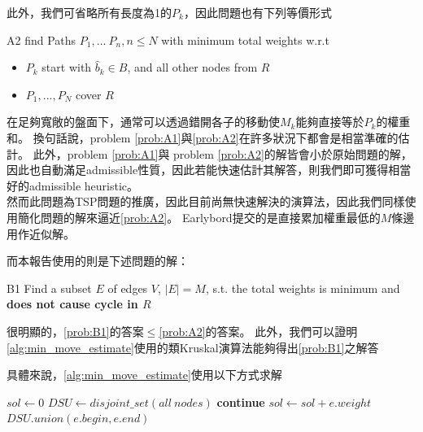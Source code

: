 \documentclass[a4paper, 12pt]{article}  %
\begin{document}
此外，我們可省略所有長度為1的$P_k$，因此問題也有下列等價形式

\begin{problem}{}{A2}
    find Paths $P_1,\ldots\ P_n,n\le N$ with minimum total weights w.r.t
    \begin{itemize}
        \item $P_k$ start with $\hat b_k\in B$, and all other nodes from $R$
        \item $P_1,...,P_N$ cover $R$
    \end{itemize}

\end{problem}

在足夠寬敞的盤面下，通常可以透過錯開各子的移動使$M_k$能夠直接等於$P_k$的權重和。
換句話說，problem \ref{prob:A1}與\ref{prob:A2}在許多狀況下都會是相當準確的估計。
此外，problem \ref{prob:A1}與 problem \ref{prob:A2}的解皆會小於原始問題的解，因此也自動滿足admissible性質，因此若能快速估計其解答，則我們即可獲得相當好的admissible heuristic。\\


然而此問題為TSP問題的推廣，因此目前尚無快速解決的演算法，因此我們同樣使用簡化問題的解來逼近\ref{prob:A2}。
Earlybord提交的是直接累加權重最低的$M$條邊用作近似解。

而本報告使用的則是下述問題的解：

\begin{problem}{}{B1}
    Find a subset $E$ of edges $V$, $|E|=M$, s.t. the total weights is minimum and \textbf{does not cause cycle in $R$} 
\end{problem}
很明顯的，\ref{prob:B1}的答案$\le$\ref{prob:A2}的答案。
此外，我們可以證明\ref{alg:min_move_estimate}使用的類Kruskal演算法能夠得出\ref{prob:B1}之解答

具體來說，\ref{alg:min_move_estimate}使用以下方式求解

\begin{algorithm}
    \begin{algorithmic}
        \State $sol\gets 0$
        \State $DSU\gets disjoint\_set(all\ nodes)$
                    \State \textbf{continue}
                \Else
                    \State $sol\gets sol + e.weight$
                    \State $DSU.union(e.begin,e.end)$
                \EndIf
            \EndIf
        \EndFor
    \end{algorithmic}
\end{algorithm}
\end{document}
